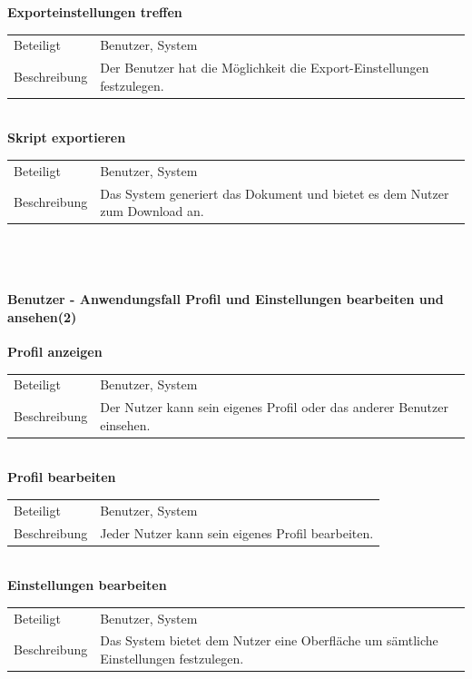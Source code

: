 \documentclass[12pt,a4paper]{article}
\begin{document}
\textbf{Exporteinstellungen treffen}\\
\begin{tabular}{l|p{12cm}}
\hline 
Beteiligt & Benutzer, System \\ 
Beschreibung & Der Benutzer hat die Möglichkeit die Export-Einstellungen festzulegen. \\ 
\end{tabular}\\

\textbf{Skript exportieren}\\
\begin{tabular}{l|p{12cm}}
\hline 
Beteiligt & Benutzer, System \\ 
Beschreibung & Das System generiert das Dokument und bietet es dem Nutzer zum Download an. \\ 
\end{tabular}\\\\


\paragraph{Benutzer - Anwendungsfall \glqq Profil und Einstellungen bearbeiten und ansehen\grqq  (2)}\mbox{}

\textbf{Profil anzeigen}\\
\begin{tabular}{l|p{12cm}}
\hline 
Beteiligt & Benutzer, System \\ 
Beschreibung & Der Nutzer kann sein eigenes Profil oder das anderer Benutzer einsehen. \\ 
\end{tabular}\\

\textbf{Profil bearbeiten}\\
\begin{tabular}{l|p{12cm}}
\hline 
Beteiligt & Benutzer, System \\ 
Beschreibung & Jeder Nutzer kann sein eigenes Profil bearbeiten. \\ 
\end{tabular}\\ 

\textbf{Einstellungen bearbeiten}\\
\begin{tabular}{l|p{12cm}}
\hline 
Beteiligt & Benutzer, System \\ 
Beschreibung & Das System bietet dem Nutzer eine Oberfläche um sämtliche Einstellungen festzulegen. \\ 
\end{tabular}\\
\end{document}
